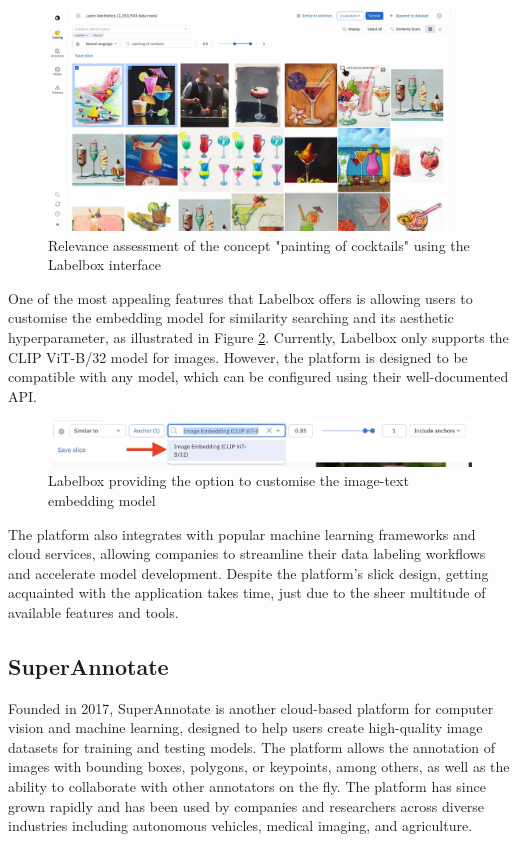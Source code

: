 \documentclass{l4proj}
\begin{document}
\begin{figure}[h]
    \centering
    \includegraphics[width=0.95\textwidth]{figures/labelbox_interface.pdf}
    \caption{Relevance assessment of the concept "painting of cocktails" using the Labelbox interface}
    \label{fig:labelbox_interface}
\end{figure}

One of the most appealing features that Labelbox offers is allowing users to customise the embedding model for similarity searching and its aesthetic hyperparameter, as illustrated in Figure \ref{fig:labelbox_model}. Currently, Labelbox only supports the CLIP ViT-B/32 model for images. However, the platform is designed to be compatible with any model, which can be configured using their well-documented API.

\begin{figure}[h]
    \centering
    \includegraphics[width=1\textwidth]{figures/labelbox_model.pdf}
    \caption{Labelbox providing the option to customise the image-text embedding model}
    \label{fig:labelbox_model}
\end{figure}

The platform also integrates with popular machine learning frameworks and cloud services, allowing companies to streamline their data labeling workflows and accelerate model development. Despite the platform's slick design, getting acquainted with the application takes time, just due to the sheer multitude of available features and tools.


\subsection{SuperAnnotate}
\label{sec:superannotate}
Founded in 2017, SuperAnnotate is another cloud-based platform for computer vision and machine learning, designed to help users create high-quality image datasets for training and testing models. The platform allows the annotation of images with bounding boxes, polygons, or keypoints, among others, as well as the ability to collaborate with other annotators on the fly. The platform has since grown rapidly and has been used by companies and researchers across diverse industries including autonomous vehicles, medical imaging, and agriculture.
\end{document}
